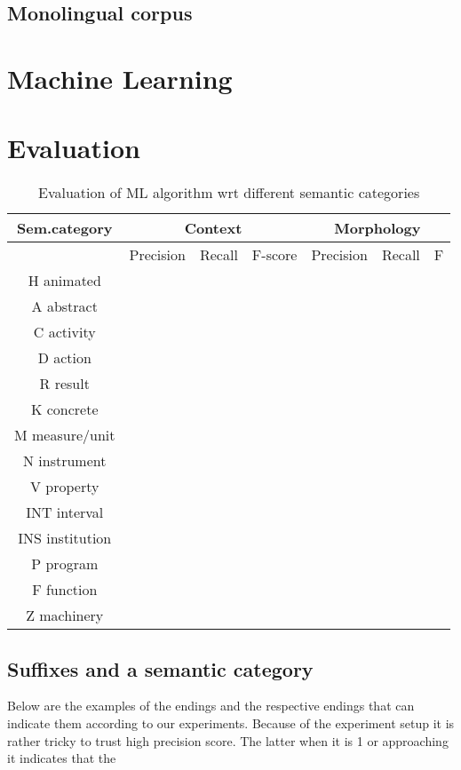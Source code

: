 \documentclass[letterpaper]{article}
\begin{document}
\begin{itemize}
\subsection{Monolingual corpus}

\section{Machine Learning}



\section{Evaluation}

\begin{table}
\caption{Evaluation of ML algorithm wrt different semantic categories}
\begin{center}
\begin{tabular}{ccccccc}\hline
Sem.category &\multicolumn{3}{|c|}{Context} & \multicolumn{3}{|c|}{Morphology}\\
\hline
             & Precision & Recall &F-score                    & Precision& Recall & F\\
\hline
H animated &&& &&&\\
A abstract &&& &&&\\
C activity &&& &&&\\
D action  &&& &&&\\
R result &&& &&&\\
K concrete &&& &&&\\
M measure/unit &&& &&&\\
N instrument &&& &&&\\
V property &&& &&&\\
INT interval &&& &&&\\
INS institution &&& &&&\\
P program &&& &&&\\
F function &&& &&&\\
Z machinery &&& &&&\\

\hline\hline
\end{tabular}
\end{center}
\end{table}


\subsection{Suffixes and a semantic category}
Below are the examples of the endings and the respective endings that
can indicate them according to our experiments.
Because of the experiment setup it is rather tricky to trust high precision
score. The latter when it is 1 or approaching it indicates that the 


\end{itemize}
\end{document}
